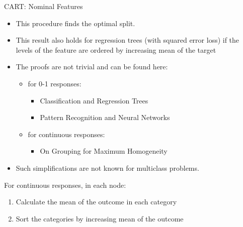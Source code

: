 \begin{vbframe}{CART: Nominal Features}
\pagebreak

  \begin{itemize}
  \item This procedure finds the optimal split.
  \item This result also holds for regression trees (with squared error loss) if the levels of the feature are ordered by increasing mean of the target
  \item The proofs are not trivial and can be found here:
    \begin{itemize}
    \item for 0-1 responses:
      \begin{itemize}
      \item Classification and Regression Trees 
      \item Pattern Recognition and Neural Networks 
      \end{itemize}
    \item for continuous responses:
      \begin{itemize}
      \item On Grouping for Maximum Homogeneity 
      \end{itemize}
    \end{itemize}
  \item Such simplifications are not known for multiclass problems.
  \end{itemize}

\pagebreak

For continuous responses, in each node:
  \begin{enumerate}
  \item Calculate the mean of the outcome in each category
  \item Sort the categories by increasing mean of the outcome
  \end{enumerate}

\vspace{0.3cm}

\begin{knitrout}\scriptsize
{}\color{fgcolor}


\end{knitrout}
\end{vbframe}
